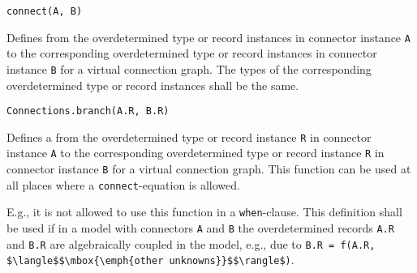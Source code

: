 \begin{operatordefinition*}[connect]\label{modelica:optional-spanning-tree-edge}
\begin{synopsis}\begin{lstlisting}
connect(A, B)
\end{lstlisting}\end{synopsis}
\begin{semantics}
Defines  from the overdetermined type or record instances in connector instance \lstinline!A! to the corresponding overdetermined type or record instances in connector instance \lstinline!B! for a virtual connection graph.
The types of the corresponding overdetermined type or record instances shall be the same.
\end{semantics}
\end{operatordefinition*}

\begin{operatordefinition}
\begin{synopsis}\begin{lstlisting}
Connections.branch(A.R, B.R)
\end{lstlisting}\end{synopsis}
\begin{semantics}
Defines a  from the overdetermined type or record instance \lstinline!R! in connector instance \lstinline!A! to the corresponding overdetermined type or record instance \lstinline!R! in connector instance \lstinline!B! for a virtual connection graph.
This function can be used at all places where a \lstinline!connect!-equation is allowed.

\begin{nonnormative}
E.g., it is not allowed to use this function in a \lstinline!when!-clause.
This definition shall be used if in a model with connectors \lstinline!A! and \lstinline!B! the overdetermined records \lstinline!A.R! and \lstinline!B.R! are algebraically coupled in the model, e.g., due to \lstinline!B.R = f(A.R, $\langle$$\mbox{\emph{other unknowns}}$$\rangle$)!.
\end{nonnormative}
\end{semantics}
\end{operatordefinition}

